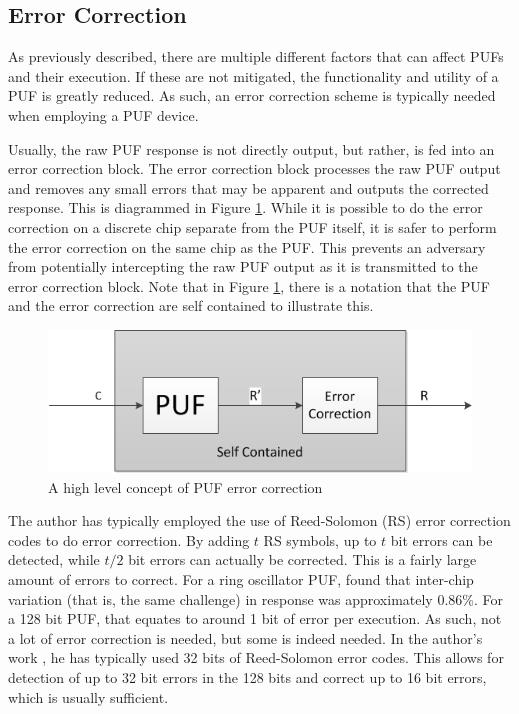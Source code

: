 
\subsection{Error Correction}
As previously described, there are multiple different factors that can affect PUFs
and their execution. If these are not mitigated, the functionality and utility of a PUF
is greatly reduced. As such, an error correction scheme is typically needed when employing
a PUF device.

Usually, the raw PUF response is not directly output, but rather, is fed into an
error correction block. The error correction block processes the raw PUF output and
removes any small errors that may be apparent and outputs the corrected response.
This is diagrammed in Figure \ref{fig:pufecc}. While it is possible to do the error
correction on a discrete chip separate from the PUF itself, it is safer to perform the
error correction on the same chip as the PUF. This prevents an adversary from potentially
intercepting the raw PUF output as it is transmitted to the error correction block. Note
that in Figure \ref{fig:pufecc}, there is a notation that the PUF and the error correction
are self contained to illustrate this.

\begin{figure}[!ht]
\includegraphics[]{images/puf_ecc.png}
\caption{A high level concept of PUF error correction}
\label{fig:pufecc}
\end{figure}

The author has typically employed the use of Reed-Solomon (RS) error correction codes to do 
error correction. By adding $t$ RS symbols, up to $t$ bit errors can be detected, 
while $t/2$ bit errors can actually be corrected. This is a fairly large amount of
errors to correct. For a ring oscillator PUF, \cite{pufhammingdistance} found that inter-chip
variation (that is, the same challenge) in response was approximately 0.86\%. For a 128 bit PUF,
that equates to around 1 bit of error per execution. As such, not a lot of error correction is needed,
but some is indeed needed. In the author's work \cite{PEAR} \cite{PUFROK} \cite{CODASPY}, he has typically 
used 32 bits of Reed-Solomon error codes. This allows for detection of up to 32 bit errors 
in the 128 bits and correct up to 16 bit errors, which is usually sufficient.

